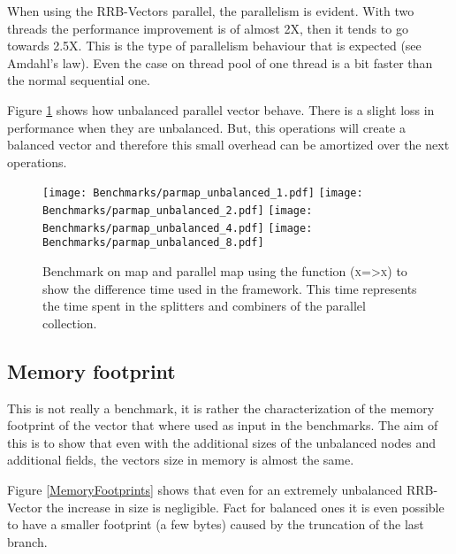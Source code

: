 When using the RRB-Vectors parallel, the parallelism is evident. With two threads the performance improvement is of almost 2X, then it tends to go towards 2.5X. This is the type of parallelism behaviour that is expected (see Amdahl's law\cite{Rodgers:1985:IMS:327010.327215}). Even the case on thread pool of one thread is a bit faster than the normal sequential one. 
\FloatBarrier

Figure \ref{ParallelUnbalancedBenchmarks} shows how unbalanced parallel vector behave. There is a slight loss in performance when they are unbalanced. But, this operations will create a balanced vector and therefore this small overhead can be amortized over the next operations.

\begin{figure}[h!]
  \centering
  \texttt{[image: Benchmarks/parmap\_unbalanced\_1.pdf]}
  \texttt{[image: Benchmarks/parmap\_unbalanced\_2.pdf]}
  \texttt{[image: Benchmarks/parmap\_unbalanced\_4.pdf]}
  \texttt{[image: Benchmarks/parmap\_unbalanced\_8.pdf]}
  \caption{Benchmark on map and parallel map using the function (\textsc{x=>x}) to show the difference time used in the framework. This time represents the time spent in the splitters and combiners of the parallel collection.}
  \label{ParallelUnbalancedBenchmarks}
\end{figure}

\FloatBarrier

\subsection{Memory footprint}
This is not really a benchmark, it is rather the characterization of the memory footprint of the vector that where used as input in the benchmarks. The aim of this is to show that even with the additional sizes of the unbalanced nodes and additional fields, the vectors size in memory is almost the same. 

Figure \ref{MemoryFootprints} shows that even for an extremely unbalanced RRB-Vector the increase in size is negligible. Fact for balanced ones it is even possible to have a smaller footprint (a few bytes) caused by the truncation of the last branch. 

